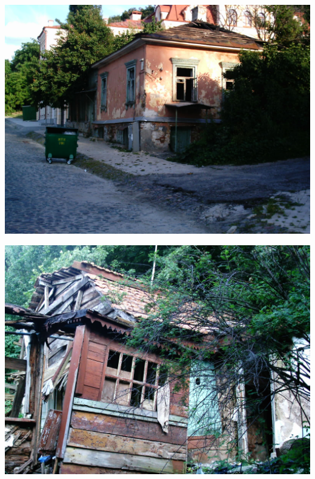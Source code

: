 \begin{center}
\includegraphics[width=0.96\linewidth]{chast-colebanie-osnov/borichev-tok/bort-imag0004.jpg}
\end{center}

\begin{center}
\includegraphics[width=0.96\linewidth]{chast-colebanie-osnov/borichev-tok/bort-imag0011.jpg}
\end{center}

\newpage

